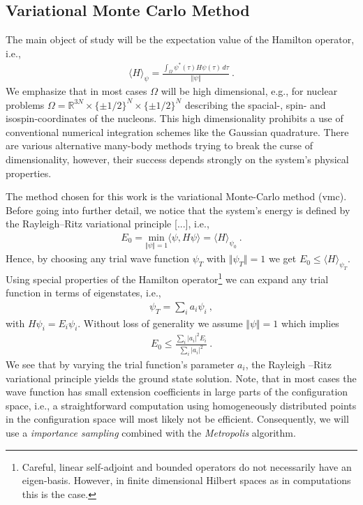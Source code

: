 \documentclass[11pt,a4paper]{article}
\numberwithin{equation}{section}
\begin{document}
\subsection{Variational Monte Carlo Method}
%
%
The main object of study will be the expectation value of the Hamilton operator, i.e.,
\begin{align*}
\langle H \rangle_{\psi} = \frac{\int_{\Omega}\psi^*(\tau) H \psi(\tau)\, d\tau}{\Vert \psi \Vert}~.
\end{align*}
We emphasize that in most cases $\Omega$ will be high dimensional, e.g., for nuclear problems $\Omega = \mathbb{R}^{3N}\times \{\pm 1/2\}^{N} \times \{\pm 1/2\}^{N}$ describing the spacial-, spin- and isospin-coordinates of the nucleons. 
%
This high dimensionality prohibits a use of conventional numerical integration schemes like the Gaussian quadrature.
%
There are various alternative many-body methods trying to break the curse of dimensionality, however, their success depends strongly on the system's physical properties.

%
The method chosen for this work is the variational Monte-Carlo method (vmc). Before going into further detail, we notice that the system's energy is defined by the Rayleigh--Ritz variational principle [...], i.e.,
\begin{align*}
E_0 = \underset{\Vert \psi \Vert=1}{\mathrm{min}}\langle \psi ,H \psi\rangle=\langle H \rangle_{\psi_0} ~.
\end{align*} 
Hence, by choosing any trial wave function $\psi_T$ with $\Vert \psi_T\Vert =1$ we get $E_0\leq \langle H \rangle_{\psi_T }$.
%
Using special properties of the Hamilton operator\footnote{
Careful, linear self-adjoint and bounded operators do not necessarily have an eigen-basis. However, in finite dimensional Hilbert spaces as in computations this is the case.
} we can expand any trial function in terms of eigenstates, i.e.,
\begin{align*}
\psi_T=\sum_{i}a_i\psi_i~,
\end{align*}
with $H\psi_i = E_i \psi_i$.
%
Without loss of generality we assume $\Vert \psi \Vert = 1$ which implies
\begin{align*}
E_0\leq \frac{\sum_{i}|a_i|^2E_i}{\sum_{i}|a_i|^2}~.
\end{align*}
We see that by varying the trial function's parameter $a_i$, the Rayleigh --Ritz variational principle yields the ground state solution.
%
Note, that in most cases the wave function has small extension coefficients in large parts of the configuration space, i.e., a straightforward computation using homogeneously distributed points in the configuration space will most likely not be efficient.  
%
Consequently, we will use a \textit{importance sampling} combined with the \textit{Metropolis} algorithm.
\end{document}
